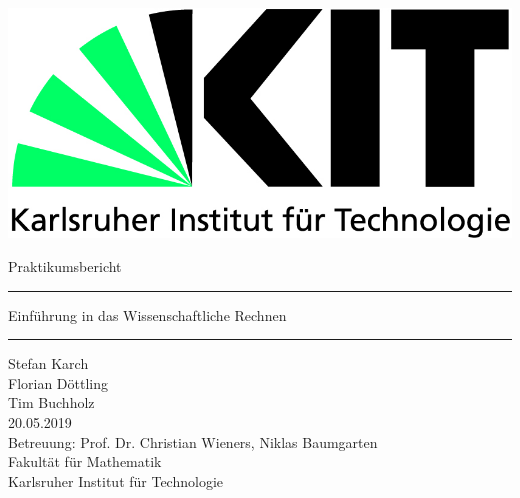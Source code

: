 \begin{titlepage}
\includegraphics[scale=0.5]{kit-logo.jpg} 
\begin{center} 
\LARGE 
\vspace*{2cm}
\LARGE Praktikumsbericht \BerichtNR
\vspace*{1.0cm}
\hrule
\vspace*{0.2cm}
{\vspace{0.2cm} \huge Einführung in das Wissenschaftliche Rechnen}\vspace{0.5cm}
\hrule
\vspace*{2.5cm}
\Large Stefan Karch \\
		Florian Döttling \\
		Tim Buchholz  \\
\vspace*{1cm}
20.05.2019 \\
\vspace*{1.5cm}
\vspace*{4.0cm}
\Large Betreuung: Prof. Dr. Christian Wieners, Niklas Baumgarten \\[0.5cm]
\Large Fakultät für Mathematik \\
\Large Karlsruher Institut für Technologie
\end{center}
\end{titlepage}